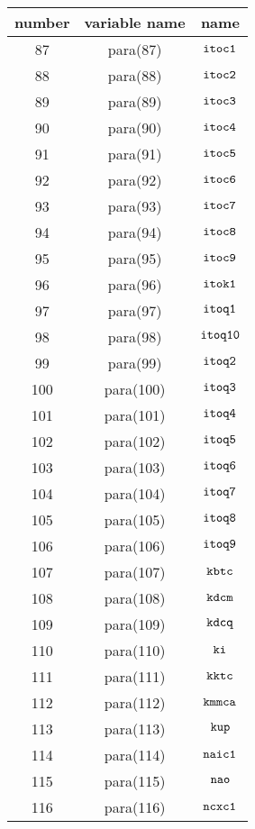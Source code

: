 \documentclass{article}
\begin{document}
\begin{center}
\begin{tabular}{|c|c|c|}
\hline
number & variable name & name \\
\hline
87 & para(87)  & $\mbox{\tt itoc1}$ \\ 
88 & para(88)  & $\mbox{\tt itoc2}$ \\ 
89 & para(89)  & $\mbox{\tt itoc3}$ \\ 
90 & para(90)  & $\mbox{\tt itoc4}$ \\ 
91 & para(91)  & $\mbox{\tt itoc5}$ \\ 
92 & para(92)  & $\mbox{\tt itoc6}$ \\ 
93 & para(93)  & $\mbox{\tt itoc7}$ \\ 
94 & para(94)  & $\mbox{\tt itoc8}$ \\ 
95 & para(95)  & $\mbox{\tt itoc9}$ \\ 
96 & para(96)  & $\mbox{\tt itok1}$ \\ 
97 & para(97)  & $\mbox{\tt itoq1}$ \\ 
98 & para(98)  & $\mbox{\tt itoq10}$ \\ 
99 & para(99)  & $\mbox{\tt itoq2}$ \\ 
100 & para(100)  & $\mbox{\tt itoq3}$ \\ 
101 & para(101)  & $\mbox{\tt itoq4}$ \\ 
102 & para(102)  & $\mbox{\tt itoq5}$ \\ 
103 & para(103)  & $\mbox{\tt itoq6}$ \\ 
104 & para(104)  & $\mbox{\tt itoq7}$ \\ 
105 & para(105)  & $\mbox{\tt itoq8}$ \\ 
106 & para(106)  & $\mbox{\tt itoq9}$ \\ 
107 & para(107)  & $\mbox{\tt kbtc}$ \\ 
108 & para(108)  & $\mbox{\tt kdcm}$ \\ 
109 & para(109)  & $\mbox{\tt kdcq}$ \\ 
110 & para(110)  & $\mbox{\tt ki}$ \\ 
111 & para(111)  & $\mbox{\tt kktc}$ \\ 
112 & para(112)  & $\mbox{\tt kmmca}$ \\ 
113 & para(113)  & $\mbox{\tt kup}$ \\ 
114 & para(114)  & $\mbox{\tt naic1}$ \\ 
115 & para(115)  & $\mbox{\tt nao}$ \\ 
116 & para(116)  & $\mbox{\tt ncxc1}$ \\ 

\end{tabular}
\end{center}
\end{document}
